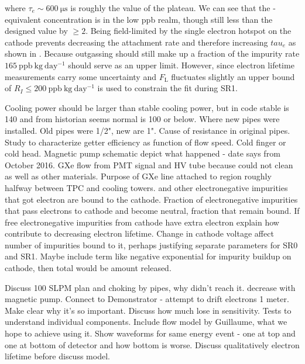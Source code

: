 \noindent where $\tau_e \sim 600\ \mathrm{\mu s}$ is roughly the value of the plateau.  We can see that the -equivalent
concentration is in the low ppb realm, though still less than the designed value by $\geq 2$.  Being field-limited by the single electron
hotspot on the cathode prevents decreasing the attachment rate and therefore increasing $tau_e$ as shown in
.  Because outgassing should still make up a fraction
of the impurity rate $165\ \mathrm{ppb\ kg\ day^{-1}}$  should serve as an upper limit.  However, since electron lifetime measurements
carry some uncertainty and $F_{\mathrm{L}}$ fluctuates slightly an upper bound of $R_I \leq 200\ \mathrm{ppb\ kg\ day^{-1}}$ is used to
constrain the fit during SR1.

Cooling power should be larger than stable cooling power, but in code stable is 140 and from historian seems normal is 100 or
below.  Where new pipes were installed.  Old pipes were 1/2", new are 1".  Cause of resistance in original pipes.  Study to characterize
getter efficiency as function of flow speed.  Cold finger or cold head.  Magnetic pump schematic depict what happened - date says
from October 2016.  GXe flow from PMT signal and HV tube because could not clean as well as other materials.  Purpose of GXe line
attached to region roughly halfway between TPC and cooling towers.   and other electronegative impurities that got electron
are bound to the cathode.  Fraction of electronegative impurities that pass electrons to cathode and become neutral, fraction that remain
bound.  If free electronegative impurities from cathode have extra electron explain how contribute to decreasing electron
lifetime.  Change in cathode voltage affect number of impurities bound to it, perhaps justifying separate parameters for SR0 and
SR1.  Maybe include term like negative exponential for impurity buildup on cathode, then total would be amount released.

Discuss 100 SLPM plan and choking by pipes, why didn't reach it.   decrease with magnetic
pump.  Connect to Demonstrator - attempt to drift electrons 1 meter.  Make clear why it's so important.  Discuss how much lose in
sensitivity.  Tests to understand individual components.  Include flow model by Guillaume, what we hope to achieve using it.  Show
waveforms for same energy event - one at top and one at bottom of detector and how bottom is worse.  Discuss qualitatively electron
lifetime before discuss model.



